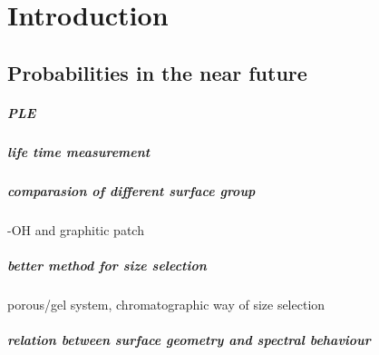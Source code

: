 \chapter{Introduction} %

\label{Chapter0.5} %

\section{ Probabilities in the near future}

\paragraph{PLE}

\paragraph{life time measurement}

\paragraph{comparasion of different surface group}
-OH and graphitic patch
\paragraph{better method for size selection}
porous/gel system, chromatographic way of size selection
\paragraph{relation between surface geometry and spectral behaviour}


